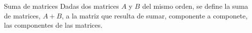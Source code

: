 

\begin{frame}

    \begin{block}{Suma de matrices}
        Dadas dos matrices $A$ y $B$ del mismo orden, se define la suma de matrices, $A+B$, a la matriz que resulta de sumar, componente a componete, las componentes de las matrices.
    \end{block}
    \vspace{3cm}

\end{frame}



